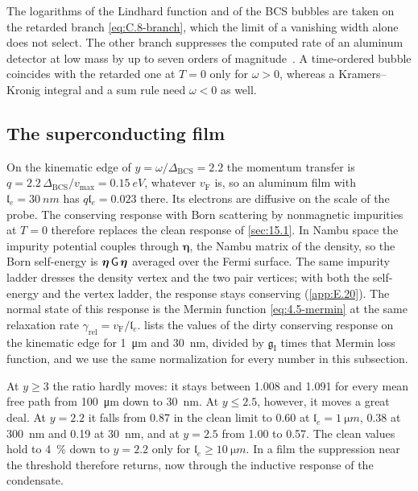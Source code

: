 The logarithms of the Lindhard function and of the BCS bubbles are taken on the retarded branch \cref{eq:C.8-branch}, which the limit of a vanishing width alone does not select. The other branch suppresses the computed rate of an aluminum detector at low mass by up to seven orders of magnitude~\cite{hochberg2021determining}. A time-ordered bubble coincides with the retarded one at $T = 0$ only for $\omega > 0$, whereas a Kramers--Kronig integral and a sum rule need $\omega < 0$ as well.

\subsection{The superconducting film}\label{sec:15.3-sc}

On the kinematic edge of $y = \omega/\Delta_{\mathrm{BCS}} = 2.2$ the momentum transfer is $q = 2.2\,\Delta_{\mathrm{BCS}}/v_{\mathrm{max}} = \SI{0.15}{eV}$, whatever $v_{\mathrm{F}}$ is, so an aluminum film with $\mathfrak{l}_e = \SI{30}{nm}$ has $q\mathfrak{l}_e = 0.023$ there. Its electrons are diffusive on the scale of the probe. The conserving response with Born scattering by nonmagnetic impurities at $T = 0$ therefore replaces the clean response of \cref{sec:15.1}. In Nambu space the impurity potential couples through $\boldsymbol{\eta}$, the Nambu matrix of the density, so the Born self-energy is $\boldsymbol{\eta}\,\mathsf{G}\,\boldsymbol{\eta}$ averaged over the Fermi surface. The same impurity ladder dresses the density vertex and the two pair vertices; with both the self-energy and the vertex ladder, the response stays conserving (\cref{app:E.20}). The normal state of this response is the Mermin function \cref{eq:4.5-mermin} at the same relaxation rate $\gamma_{\mathrm{rel}} = v_{\mathrm{F}}/\mathfrak{l}_e$.  lists the values of the dirty conserving response on the kinematic edge for \SI{1}{\micro m} and \SI{30}{nm}, divided by $\mathfrak{g}_{\mathrm{I}}$ times that Mermin loss function, and we use the same normalization for every number in this subsection.

At $y \ge 3$ the ratio hardly moves: it stays between 1.008 and 1.091 for every mean free path from \SI{100}{\micro m} down to \SI{30}{nm}. At $y \le 2.5$, however, it moves a great deal. At $y = 2.2$ it falls from 0.87 in the clean limit to 0.60 at $\mathfrak{l}_e = \SI{1}{\micro m}$, 0.38 at \SI{300}{nm} and 0.19 at \SI{30}{nm}, and at $y = 2.5$ from 1.00 to 0.57. The clean values hold to \SI{4}{\percent} down to $y = 2.2$ only for $\mathfrak{l}_e \ge \SI{10}{\micro m}$. In a film the suppression near the threshold therefore returns, now through the inductive response of the condensate.

